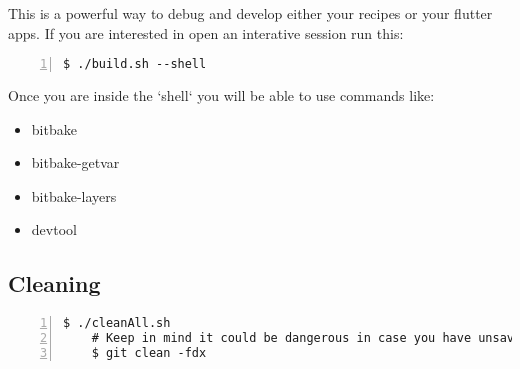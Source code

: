 This is a powerful way to debug and develop either your recipes or your flutter apps. If you are interested in open an interative session run this:

\begin{lstlisting}[style=consola, numbers=left]
    $ ./build.sh --shell
\end{lstlisting}

Once you are inside the `shell` you will be able to use commands like:

\begin{itemize}
    \item bitbake
    \item bitbake-getvar
    \item bitbake-layers
    \item devtool
\end{itemize}

\subsection{Cleaning}

\begin{lstlisting}[style=consola, numbers=left]
    $ ./cleanAll.sh
    # Keep in mind it could be dangerous in case you have unsaved changes.
    $ git clean -fdx
\end{lstlisting}


